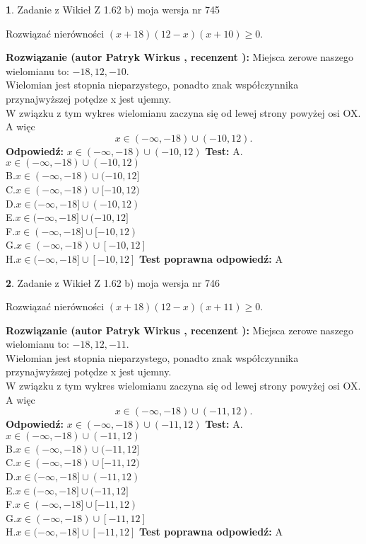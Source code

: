 \documentclass[12pt, a4paper]{article}
\theoremstyle{definition} %
\newtheorem{zad}{}
\newcommand{\zadStart}[1]{\begin{zad}#1\newline}
\newcommand{\zadStop}{\end{zad}}
\newcommand{\rozwStart}[2]{\noindent \textbf{Rozwiązanie (autor #1 , recenzent #2): }\newline}
\newcommand{\rozwStop}{\newline}
\newcommand{\odpStart}{\noindent \textbf{Odpowiedź:}\newline}
\newcommand{\odpStop}{\newline}
\newcommand{\testStart}{\noindent \textbf{Test:}\newline}
\newcommand{\testStop}{\newline}
\newcommand{\kluczStart}{\noindent \textbf{Test poprawna odpowiedź:}\newline}
\newcommand{\kluczStop}{\newline}
\begin{document}
\zadStart{Zadanie z Wikieł Z 1.62 b) moja wersja nr 745}

Rozwiązać nierówności $(x+18)(12-x)(x+10)\ge0$.
\zadStop
\rozwStart{Patryk Wirkus}{}
Miejsca zerowe naszego wielomianu to: $-18, 12, -10$.\\
Wielomian jest stopnia nieparzystego, ponadto znak współczynnika przy\linebreak najwyższej potędze x jest ujemny.\\ W związku z tym wykres wielomianu zaczyna się od lewej strony powyżej osi OX. A więc $$x \in (-\infty,-18) \cup (-10,12).$$
\rozwStop
\odpStart
$x \in (-\infty,-18) \cup (-10,12)$
\odpStop
\testStart
A.$x \in (-\infty,-18) \cup (-10,12)$\\
B.$x \in (-\infty,-18) \cup (-10,12]$\\
C.$x \in (-\infty,-18) \cup [-10,12)$\\
D.$x \in (-\infty,-18] \cup (-10,12)$\\
E.$x \in (-\infty,-18] \cup (-10,12]$\\
F.$x \in (-\infty,-18] \cup [-10,12)$\\
G.$x \in (-\infty,-18) \cup [-10,12]$\\
H.$x \in (-\infty,-18] \cup [-10,12]$
\testStop
\kluczStart
A
\kluczStop



\zadStart{Zadanie z Wikieł Z 1.62 b) moja wersja nr 746}

Rozwiązać nierówności $(x+18)(12-x)(x+11)\ge0$.
\zadStop
\rozwStart{Patryk Wirkus}{}
Miejsca zerowe naszego wielomianu to: $-18, 12, -11$.\\
Wielomian jest stopnia nieparzystego, ponadto znak współczynnika przy\linebreak najwyższej potędze x jest ujemny.\\ W związku z tym wykres wielomianu zaczyna się od lewej strony powyżej osi OX. A więc $$x \in (-\infty,-18) \cup (-11,12).$$
\rozwStop
\odpStart
$x \in (-\infty,-18) \cup (-11,12)$
\odpStop
\testStart
A.$x \in (-\infty,-18) \cup (-11,12)$\\
B.$x \in (-\infty,-18) \cup (-11,12]$\\
C.$x \in (-\infty,-18) \cup [-11,12)$\\
D.$x \in (-\infty,-18] \cup (-11,12)$\\
E.$x \in (-\infty,-18] \cup (-11,12]$\\
F.$x \in (-\infty,-18] \cup [-11,12)$\\
G.$x \in (-\infty,-18) \cup [-11,12]$\\
H.$x \in (-\infty,-18] \cup [-11,12]$
\testStop
\kluczStart
A
\kluczStop
\end{document}
